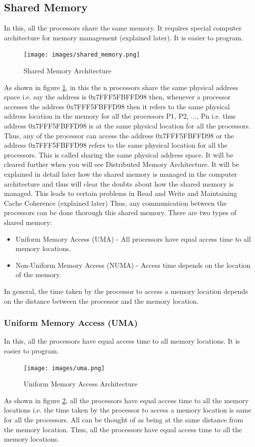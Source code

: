 \documentclass[12pt]{article}
\begin{document}
\subsection{Shared Memory}
In this, all the processors share the same memory. It requires special computer architecture for memory management (explained later). 
It is easier to program.
\begin{figure}[H]
    \centering
    \texttt{[image: images/shared\_memory.png]}
    \caption{Shared Memory Architecture}
    \label{fig:shared_memory}
\end{figure}
As shown in figure \ref{fig:shared_memory}, in this the n processors share the same physical address space i.e.
say the address is 0x7FFF5FBFFD98 then, whenever a processor accesses the address 0x7FFF5FBFFD98 then it refers to the same physical address location in the memory 
for all the processors P1, P2, ..., Pn i.e. thus address 0x7FFF5FBFFD98 is at the same physical location for
all the processors. Thus, any of the processor can access the address 0x7FFF5FBFFD98 or the address 0x7FFF5FBFFD98 refers to the 
same physical location for all the processors. This is called sharing the same physical address space.
It will be cleared further when you will see Distributed Memory Architecture.
It will be explained in detail later how the shared memory is managed in the computer architecture and thus will clear the doubts about how the shared memory is managed. 
This leads to certain problems in Read and Write and Maintaining Cache Coherence (explained later)
Thus, any communication between the processors can be done thorough this shared memory. 
There are two types of shared memory:
\begin{itemize}
    \item Uniform Memory Access (UMA) - All processors have equal access time to all memory locations.
    \item Non-Uniform Memory Access (NUMA) - Access time depends on the location of the memory.
\end{itemize}
In general, the time taken by the processor to access a memory location depends on the 
distance between the processor and the memory location.
\subsubsection{Uniform Memory Access (UMA)}
In this, all the processors have equal access time to all memory locations. It is easier to program.
\begin{figure}[H]
    \centering
    \texttt{[image: images/uma.png]}
    \caption{Uniform Memory Access Architecture}
    \label{fig:uma}
\end{figure}
As shown in figure \ref{fig:uma}, all the processors have equal access time to all the memory locations i.e.
the time taken by the processor to access a memory location is same for all the processors. All can be thought of as being at 
the same distance from the memory location. Thus, all the processors have equal access time to all the memory locations.
\end{document}
